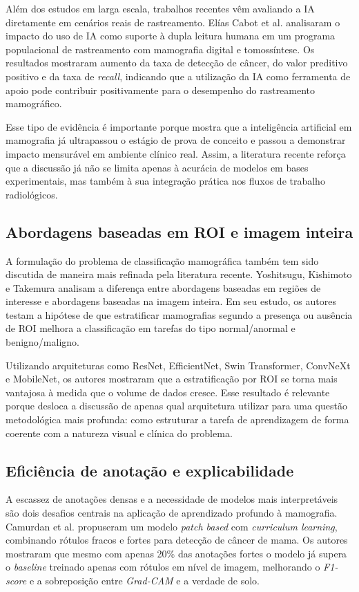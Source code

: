 \documentclass[
    12pt,
    openright,
    oneside,
    a4paper,
    english,
    brazil
]{abntex2}
\begin{document}
Além dos estudos em larga escala, trabalhos recentes vêm avaliando a IA diretamente em cenários reais de rastreamento. Elías Cabot et al. \cite{eliascabot2024} analisaram o impacto do uso de IA como suporte à dupla leitura humana em um programa populacional de rastreamento com mamografia digital e tomossíntese. Os resultados mostraram aumento da taxa de detecção de câncer, do valor preditivo positivo e da taxa de \textit{recall}, indicando que a utilização da IA como ferramenta de apoio pode contribuir positivamente para o desempenho do rastreamento mamográfico.

Esse tipo de evidência é importante porque mostra que a inteligência artificial em mamografia já ultrapassou o estágio de prova de conceito e passou a demonstrar impacto mensurável em ambiente clínico real. Assim, a literatura recente reforça que a discussão já não se limita apenas à acurácia de modelos em bases experimentais, mas também à sua integração prática nos fluxos de trabalho radiológicos.

\subsection{Abordagens baseadas em ROI e imagem inteira}

A formulação do problema de classificação mamográfica também tem sido discutida de maneira mais refinada pela literatura recente. Yoshitsugu, Kishimoto e Takemura \cite{yoshitsugu2026} analisam a diferença entre abordagens baseadas em regiões de interesse e abordagens baseadas na imagem inteira. Em seu estudo, os autores testam a hipótese de que estratificar mamografias segundo a presença ou ausência de ROI melhora a classificação em tarefas do tipo normal/anormal e benigno/maligno.

Utilizando arquiteturas como ResNet, EfficientNet, Swin Transformer, ConvNeXt e MobileNet, os autores mostraram que a estratificação por ROI se torna mais vantajosa à medida que o volume de dados cresce. Esse resultado é relevante porque desloca a discussão de apenas qual arquitetura utilizar para uma questão metodológica mais profunda: como estruturar a tarefa de aprendizagem de forma coerente com a natureza visual e clínica do problema.

\subsection{Eficiência de anotação e explicabilidade}

A escassez de anotações densas e a necessidade de modelos mais interpretáveis são dois desafios centrais na aplicação de aprendizado profundo à mamografia. Camurdan et al. \cite{camurdan2025} propuseram um modelo \textit{patch based} com \textit{curriculum learning}, combinando rótulos fracos e fortes para detecção de câncer de mama. Os autores mostraram que mesmo com apenas 20\% das anotações fortes o modelo já supera o \textit{baseline} treinado apenas com rótulos em nível de imagem, melhorando o \textit{F1-score} e a sobreposição entre \textit{Grad-CAM} e a verdade de solo.
\end{document}
